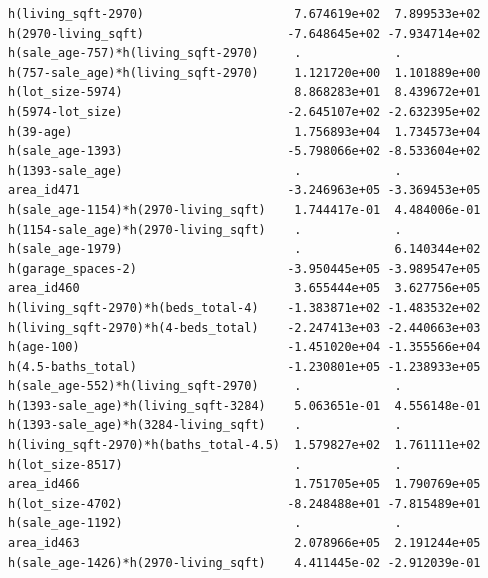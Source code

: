 \documentclass[
]{article}
\begin{document}
\begin{verbatim}
h(living_sqft-2970)                     7.674619e+02  7.899533e+02
h(2970-living_sqft)                    -7.648645e+02 -7.934714e+02
h(sale_age-757)*h(living_sqft-2970)     .             .           
h(757-sale_age)*h(living_sqft-2970)     1.121720e+00  1.101889e+00
h(lot_size-5974)                        8.868283e+01  8.439672e+01
h(5974-lot_size)                       -2.645107e+02 -2.632395e+02
h(39-age)                               1.756893e+04  1.734573e+04
h(sale_age-1393)                       -5.798066e+02 -8.533604e+02
h(1393-sale_age)                        .             .           
area_id471                             -3.246963e+05 -3.369453e+05
h(sale_age-1154)*h(2970-living_sqft)    1.744417e-01  4.484006e-01
h(1154-sale_age)*h(2970-living_sqft)    .             .           
h(sale_age-1979)                        .             6.140344e+02
h(garage_spaces-2)                     -3.950445e+05 -3.989547e+05
area_id460                              3.655444e+05  3.627756e+05
h(living_sqft-2970)*h(beds_total-4)    -1.383871e+02 -1.483532e+02
h(living_sqft-2970)*h(4-beds_total)    -2.247413e+03 -2.440663e+03
h(age-100)                             -1.451020e+04 -1.355566e+04
h(4.5-baths_total)                     -1.230801e+05 -1.238933e+05
h(sale_age-552)*h(living_sqft-2970)     .             .           
h(1393-sale_age)*h(living_sqft-3284)    5.063651e-01  4.556148e-01
h(1393-sale_age)*h(3284-living_sqft)    .             .           
h(living_sqft-2970)*h(baths_total-4.5)  1.579827e+02  1.761111e+02
h(lot_size-8517)                        .             .           
area_id466                              1.751705e+05  1.790769e+05
h(lot_size-4702)                       -8.248488e+01 -7.815489e+01
h(sale_age-1192)                        .             .           
area_id463                              2.078966e+05  2.191244e+05
h(sale_age-1426)*h(2970-living_sqft)    4.411445e-02 -2.912039e-01
                                                                  

\end{verbatim}
\end{document}
